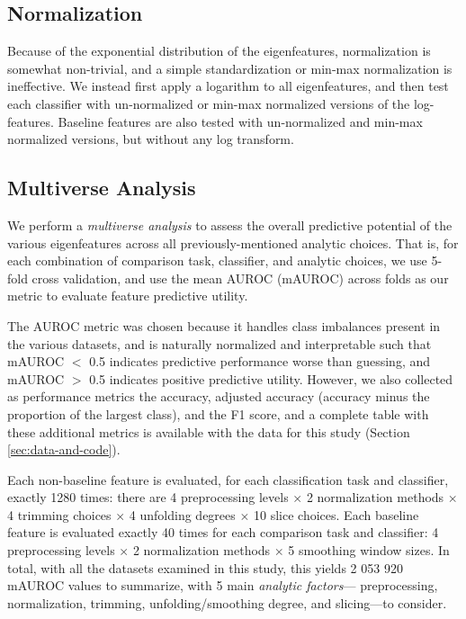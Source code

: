 \documentclass[12pt]{spieman}  %
\begin{document}
\begin{spacing}{2}
\subsection{Normalization}

Because of the exponential distribution of the eigenfeatures, normalization is
somewhat non-trivial, and a simple standardization or min-max normalization is
ineffective. We instead first apply a logarithm to all eigenfeatures, and then
test each classifier with un-normalized or min-max normalized versions of the
log-features. Baseline features are also tested with un-normalized and min-max
normalized versions, but without any log transform.





\subsection{Multiverse Analysis}
\label{sec:multiverse}

We perform a \textit{multiverse
analysis}\cite{steegenIncreasingTransparencyMultiverse2016} to assess the
overall predictive potential of the various eigenfeatures across all
previously-mentioned analytic choices. That is, for each combination of
comparison task, classifier, and analytic choices, we use 5-fold cross
validation, and use the mean AUROC (mAUROC) across folds as our metric to
evaluate feature predictive utility.

The AUROC metric was chosen because it handles class imbalances present in the
various datasets, and is naturally normalized and interpretable such that
mAUROC \(<\) 0.5 indicates predictive performance worse than guessing, and
mAUROC \(>\) 0.5 indicates positive predictive
utility\cite{mandrekarReceiverOperatingCharacteristic2010}. However, we also
collected as performance metrics the accuracy, adjusted accuracy (accuracy
minus the proportion of the largest class), and the F1 score, and a complete
table with these additional metrics is available with the data for this study
(Section \ref{sec:data-and-code}).

Each non-baseline feature is evaluated, for each classification task and
classifier, exactly 1280 times: there are 4 preprocessing levels \(\times\) 2
normalization methods \(\times\) 4 trimming choices \(\times\) 4 unfolding
degrees  \(\times\) 10 slice choices. Each baseline feature is evaluated
exactly 40 times for each comparison task and classifier: 4 preprocessing
levels \(\times\) 2 normalization methods \(\times\) 5 smoothing window sizes.
In total, with all the datasets examined in this study, this yields 2 053 920
mAUROC values to summarize, with 5 main \textit{analytic factors}—
preprocessing, normalization, trimming, unfolding/smoothing degree, and
slicing—to consider.


\end{spacing}
\end{document}
